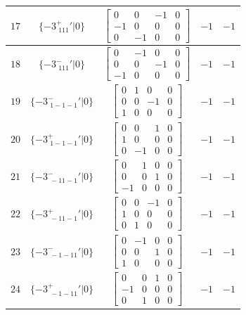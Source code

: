 \documentclass[fleqn,8pt]{jsarticle}
\begin{document}
\begin{longtable}{ccccc}
$ 17 $ & $ \{-3^{+}_{\,\,111}{}'|0\} $ & $ \begin{bmatrix} 0 & 0 & -1 & 0 \\ -1 & 0 & 0 & 0 \\ 0 & -1 & 0 & 0 \end{bmatrix} $ & $ -1 $ & $ -1 $ \\ \hline
$ 18 $ & $ \{-3^{-}_{\,\,111}{}'|0\} $ & $ \begin{bmatrix} 0 & -1 & 0 & 0 \\ 0 & 0 & -1 & 0 \\ -1 & 0 & 0 & 0 \end{bmatrix} $ & $ -1 $ & $ -1 $ \\ \hline
$ 19 $ & $ \{-3^{-}_{\,\,1-1-1}{}'|0\} $ & $ \begin{bmatrix} 0 & 1 & 0 & 0 \\ 0 & 0 & -1 & 0 \\ 1 & 0 & 0 & 0 \end{bmatrix} $ & $ -1 $ & $ -1 $ \\ \hline
$ 20 $ & $ \{-3^{+}_{\,\,1-1-1}{}'|0\} $ & $ \begin{bmatrix} 0 & 0 & 1 & 0 \\ 1 & 0 & 0 & 0 \\ 0 & -1 & 0 & 0 \end{bmatrix} $ & $ -1 $ & $ -1 $ \\ \hline
$ 21 $ & $ \{-3^{-}_{\,\,-11-1}{}'|0\} $ & $ \begin{bmatrix} 0 & 1 & 0 & 0 \\ 0 & 0 & 1 & 0 \\ -1 & 0 & 0 & 0 \end{bmatrix} $ & $ -1 $ & $ -1 $ \\ \hline
$ 22 $ & $ \{-3^{+}_{\,\,-11-1}{}'|0\} $ & $ \begin{bmatrix} 0 & 0 & -1 & 0 \\ 1 & 0 & 0 & 0 \\ 0 & 1 & 0 & 0 \end{bmatrix} $ & $ -1 $ & $ -1 $ \\ \hline
$ 23 $ & $ \{-3^{-}_{\,\,-1-11}{}'|0\} $ & $ \begin{bmatrix} 0 & -1 & 0 & 0 \\ 0 & 0 & 1 & 0 \\ 1 & 0 & 0 & 0 \end{bmatrix} $ & $ -1 $ & $ -1 $ \\ \hline
$ 24 $ & $ \{-3^{+}_{\,\,-1-11}{}'|0\} $ & $ \begin{bmatrix} 0 & 0 & 1 & 0 \\ -1 & 0 & 0 & 0 \\ 0 & 1 & 0 & 0 \end{bmatrix} $ & $ -1 $ & $ -1 $ \\ \hline

\end{longtable}
\end{document}
